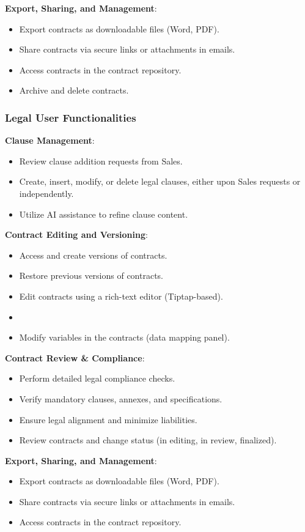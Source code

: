 \textbf{Export, Sharing, and Management}:
\begin{itemize}
\item Export contracts as downloadable files (Word, PDF).
\item Share contracts via secure links or attachments in emails.
\item Access contracts in the contract repository.
\item Archive and delete contracts.
\end{itemize}

\subsubsection{Legal User Functionalities}

\textbf{Clause Management}:
\begin{itemize}
\item Review clause addition requests from Sales.
\item Create, insert, modify, or delete legal clauses, either upon Sales requests or independently.
\item Utilize AI assistance to refine clause content.
\end{itemize}

\textbf{Contract Editing and Versioning}:
\begin{itemize}
\item Access and create versions of contracts.
\item Restore previous versions of contracts.
\item Edit contracts using a rich-text editor (Tiptap-based).
\item \item Modify variables in the contracts (data mapping panel).
\end{itemize}

\textbf{Contract Review \& Compliance}:
\begin{itemize}
\item Perform detailed legal compliance checks.
\item Verify mandatory clauses, annexes, and specifications.
\item Ensure legal alignment and minimize liabilities.
\item Review contracts and change status (in editing, in review, finalized).
\end{itemize}

\textbf{Export, Sharing, and Management}:
\begin{itemize}
\item Export contracts as downloadable files (Word, PDF).
\item Share contracts via secure links or attachments in emails.
\item Access contracts in the contract repository.
\end{itemize}

